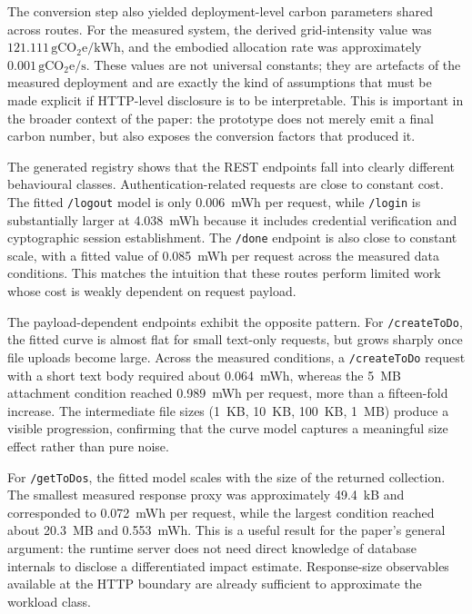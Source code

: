 The conversion step also yielded deployment-level carbon parameters shared across routes. For the measured system, the derived grid-intensity value was \(\num{121.111}\,\mathrm{gCO_2e/kWh}\), and the embodied allocation rate was approximately \(\num{0.001}\,\mathrm{gCO_2e/s}\). These values are not universal constants; they are artefacts of the measured deployment and are exactly the kind of assumptions that must be made explicit if HTTP-level disclosure is to be interpretable. This is important in the broader context of the paper: the prototype does not merely emit a final carbon number, but also exposes the conversion factors that produced it.

The generated registry shows that the REST endpoints fall into clearly different behavioural classes. Authentication-related requests are close to constant cost. The fitted \texttt{/logout} model is only \SI{0.006}{mWh} per request, while \texttt{/login} is substantially larger at \SI{4.038}{mWh} because it includes credential verification and cyptographic session establishment. The \texttt{/done} endpoint is also close to constant scale, with a fitted value of \SI{0.085}{mWh} per request across the measured data conditions. This matches the intuition that these routes perform limited work whose cost is weakly dependent on request payload.

The payload-dependent endpoints exhibit the opposite pattern. For \texttt{/createToDo}, the fitted curve is almost flat for small text-only requests, but grows sharply once file uploads become large. Across the measured conditions, a \texttt{/createToDo} request with a short text body required about \SI{0.064}{mWh}, whereas the \SI{5}{MB} attachment condition reached \SI{0.989}{mWh} per request, more than a fifteen-fold increase. The intermediate file sizes (\SI{1}{KB}, \SI{10}{KB}, \SI{100}{KB}, \SI{1}{MB}) produce a visible progression, confirming that the curve model captures a meaningful size effect rather than pure noise.

For \texttt{/getToDos}, the fitted model scales with the size of the returned collection. The smallest measured response proxy was approximately \SI{49.4}{kB} and corresponded to \SI{0.072}{mWh} per request, while the largest condition reached about \SI{20.3}{MB} and \SI{0.553}{mWh}. This is a useful result for the paper's general argument: the runtime server does not need direct knowledge of database internals to disclose a differentiated impact estimate. Response-size observables available at the HTTP boundary are already sufficient to approximate the workload class.

